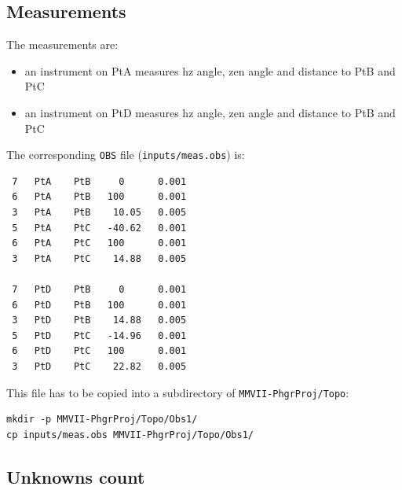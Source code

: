 \subsection{Measurements}
The measurements are:
\begin{itemize}
   \item an instrument on PtA measures hz angle, zen angle and distance to PtB and PtC
   \item an instrument on PtD measures hz angle, zen angle and distance to PtB and PtC
\end{itemize}
The corresponding \texttt{OBS} file (\texttt{inputs/meas.obs}) is:
\begin{verbatim}
 7   PtA    PtB     0      0.001
 6   PtA    PtB   100      0.001
 3   PtA    PtB    10.05   0.005
 5   PtA    PtC   -40.62   0.001
 6   PtA    PtC   100      0.001
 3   PtA    PtC    14.88   0.005

 7   PtD    PtB     0      0.001
 6   PtD    PtB   100      0.001
 3   PtD    PtB    14.88   0.005
 5   PtD    PtC   -14.96   0.001
 6   PtD    PtC   100      0.001
 3   PtD    PtC    22.82   0.005
\end{verbatim}
This file has to be copied into a subdirectory of \texttt{MMVII-PhgrProj/Topo}:
\begin{lstlisting}
mkdir -p MMVII-PhgrProj/Topo/Obs1/
cp inputs/meas.obs MMVII-PhgrProj/Topo/Obs1/
\end{lstlisting}


\subsection{Unknowns count}

